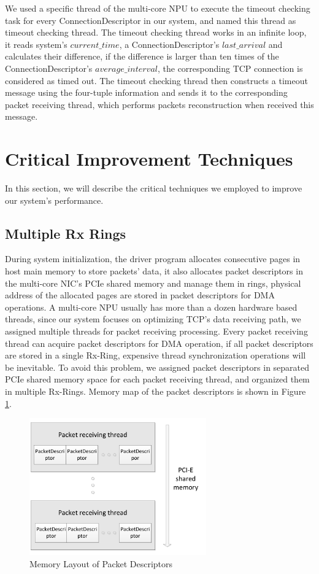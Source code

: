 \documentclass[conference]{IEEEtran}
\begin{document}
We used a specific thread of the multi-core NPU to execute the timeout checking task for every ConnectionDescriptor in our system, and named this thread as timeout checking thread. The timeout checking thread works in an infinite loop, it reads system's $current\_time$, a ConnectionDescriptor's $last\_arrival$ and calculates their difference, if the difference is larger than ten times of the ConnectionDescriptor's $average\_interval$, the corresponding TCP connection is considered as timed out. The timeout checking thread then constructs a timeout message using the four-tuple information and sends it to the corresponding packet receiving thread, which performs packets reconstruction when received this message.
\section{Critical Improvement Techniques}
In this section, we will describe the critical techniques we employed to improve our system's performance.
\subsection{Multiple Rx Rings}
During system initialization, the driver program allocates consecutive pages in host main memory to store packets' data, it also allocates packet descriptors in the multi-core NIC's PCIe shared memory and manage them in rings, physical address of the allocated pages are stored in packet descriptors for DMA operations. A multi-core NPU usually has more than a dozen hardware based threads, since our system focuses on optimizing TCP's data receiving path, we assigned multiple threads for packet receiving processing. Every packet receiving thread can acquire packet descriptors for DMA operation, if all packet descriptors are stored in a single Rx-Ring, expensive thread synchronization operations will be inevitable. To avoid this problem, we assigned packet descriptors in separated PCIe shared memory space for each packet receiving thread, and organized them in multiple Rx-Rings. Memory map of the packet descriptors is shown in Figure \ref{packet descriptor}.
\begin{figure}[!t]
\centering
\includegraphics[width=3.0in]{packet_descriptor}
\caption{Memory Layout of Packet Descriptors}
\label{packet descriptor}
\end{figure}
\end{document}
